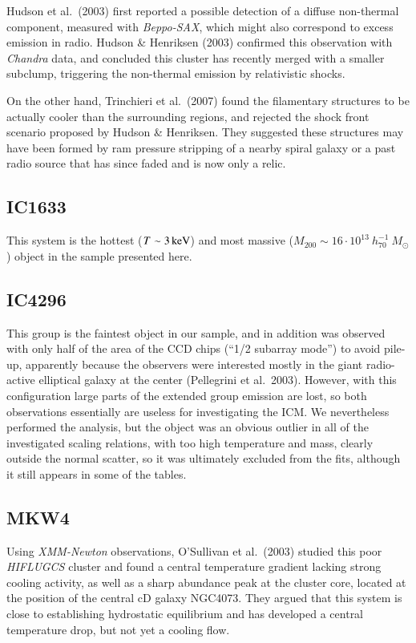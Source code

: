 \documentclass[structabstract]{aa}
\begin{document}
Hudson et al.\ (2003) first reported a possible detection of a diffuse non-thermal
component, measured with \emph{Beppo-SAX}, which might also correspond to
excess emission in radio. Hudson \& Henriksen (2003) confirmed this
observation with \emph{Chandra} data, and concluded this cluster has recently
merged with a smaller subclump, triggering the non-thermal emission by
relativistic shocks.

On the other hand, Trinchieri et al.\ (2007) found the filamentary structures
to be actually cooler than the surrounding regions, and rejected the shock
front scenario proposed by Hudson \& Henriksen. They suggested these
structures may have been formed by ram pressure stripping of a nearby spiral
galaxy or a past radio source that has since faded and is now only a relic.
\subsection*{IC1633}
This system is the hottest ($T\sim\unit[3]{keV}$) and most massive
($M_{200}\sim16\cdot10^{13}~h^{-1}_{70}~ M_{\odot}$) object in
the sample presented here.
 \subsection*{IC4296}
This group is the faintest object in our sample, and in addition was observed
with only half of the area of the CCD chips (``1/2 subarray mode'') to avoid
pile-up, apparently because the observers were interested mostly in the giant
radio-active elliptical galaxy at the center (Pellegrini et
al.\ 2003). However, with this configuration large parts of the extended group
emission are lost, so both observations essentially are useless for
investigating the ICM. We nevertheless performed the analysis, but the object
was an obvious outlier in all of the investigated scaling relations, with too
high temperature and mass, clearly outside the normal scatter, so it was
ultimately excluded from the fits, although it still appears in some of the tables.
\subsection*{MKW4}
Using \emph{XMM-Newton} observations, O'Sullivan et al.\ (2003) studied this
poor \emph{HIFLUGCS} cluster and found a central temperature gradient lacking
strong cooling activity, as well as a sharp abundance peak at the cluster
core, located at the position of the central cD galaxy NGC4073. They argued
that this system is close to establishing hydrostatic equilibrium and has
developed a central temperature drop, but not yet a cooling flow.
\end{document}
